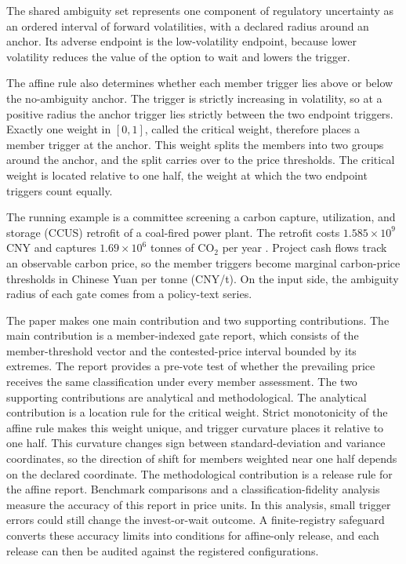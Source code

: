 The shared ambiguity set represents one component of regulatory uncertainty as an ordered interval of forward volatilities, with a declared radius around an anchor. Its adverse endpoint is the low-volatility endpoint, because lower volatility reduces the value of the option to wait and lowers the trigger.

The affine rule also determines whether each member trigger lies above or below the no-ambiguity anchor. The trigger is strictly increasing in volatility, so at a positive radius the anchor trigger lies strictly between the two endpoint triggers. Exactly one weight in $[0,1]$, called the critical weight, therefore places a member trigger at the anchor. This weight splits the members into two groups around the anchor, and the split carries over to the price thresholds. The critical weight is located relative to one half, the weight at which the two endpoint triggers count equally.

The running example is a committee screening a carbon capture, utilization, and storage (CCUS) retrofit of a coal-fired power plant. The retrofit costs $1.585\times10^{9}$\,CNY and captures $1.69\times10^{6}$ tonnes of CO$_2$ per year \citep{Sun2024}. Project cash flows track an observable carbon price, so the member triggers become marginal carbon-price thresholds in Chinese Yuan per tonne (CNY/t). On the input side, the ambiguity radius of each gate comes from a policy-text series.

The paper makes one main contribution and two supporting contributions. The main contribution is a member-indexed gate report, which consists of the member-threshold vector and the contested-price interval bounded by its extremes. The report provides a pre-vote test of whether the prevailing price receives the same classification under every member assessment. The two supporting contributions are analytical and methodological. The analytical contribution is a location rule for the critical weight. Strict monotonicity of the affine rule makes this weight unique, and trigger curvature places it relative to one half. This curvature changes sign between standard-deviation and variance coordinates, so the direction of shift for members weighted near one half depends on the declared coordinate. The methodological contribution is a release rule for the affine report. Benchmark comparisons and a classification-fidelity analysis measure the accuracy of this report in price units. In this analysis, small trigger errors could still change the invest-or-wait outcome. A finite-registry safeguard converts these accuracy limits into conditions for affine-only release, and each release can then be audited against the registered configurations.

